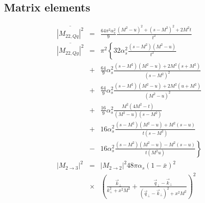 \documentclass[aps, prc, reprint, amsmath, groupedaddress, nofootinbib]{revtex4-1}
\begin{document}
\begin{appendices}
\section{Matrix elements}
\label{appendix:matrix-element}
\begin{eqnarray}
\overline{|M_{22,Qq}|^2} &=& \frac{64\pi^2\alpha_s^2}{9} \frac{(M^2-u)^2 + (s-M^2)^2 + 2 M^2 t}{t^2}
\nonumber
\\
\overline{|M_{22,Qg}|^2} &=& \pi^2 \left\{
32\alpha_s^2 \frac{(s-M^2)(M^2-u)}{t^2} \right.
\nonumber
\\
&+&\frac{64}{9}\alpha_s^2 \frac{(s-M^2)(M^2-u)+2M^2(s+M^2)}{(s-M^2)^2} \nonumber
\\
&+&\frac{64}{9}\alpha_s^2 \frac{(s-M^2)(M^2-u)+2M^2(u+M^2)}{(M^2-u)^2} \nonumber
\\
&+& \frac{16}{9}\alpha_s^2 \frac{M^2(4M^2 - t)}{(M^2-u)(s-M^2)} 
\nonumber
\\
&+& 16 \alpha_s^2 \frac{(s-M^2)(M^2-u)+M^2(s-u)}{t(s-M^2)}
\nonumber
\\
&-& \left. 16 \alpha_s^2 \frac{(s-M^2)(M^2-u)-M^2(s-u)}{t(M^2u)}\right\}
\nonumber
\\
|M_{2\rightarrow 3}|^2 &=& |M_{2\rightarrow 2}|^2 48 \pi \alpha_s (1-\bar{x})^2
\nonumber
\\
&\times&\left(\frac{\vec{k}_\perp}{k_\perp^2 + x^2 M^2} + \frac{\vec{q}_\perp - \vec{k}_\perp}{(\vec{q}_\perp-\vec{k}_\perp)^2 + x^2 M^2}
\right)^2 
\end{eqnarray}


\end{appendices}
\end{document}
